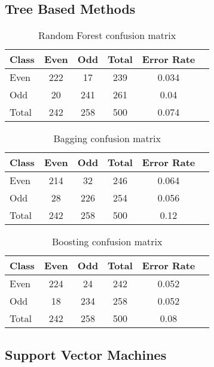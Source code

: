 \documentclass[a4paper,10pt]{article}
\begin{document}
\subsection{Tree Based Methods}
\begin{figure}[H]
  \hfill
  \hfill
\end{figure}

\begin{table}[h]
\centering
\begin{tabular}{l*{4}{c}r}
  Class & Even & Odd & Total & Error Rate\\
  \hline
  Even & 222 & 17 & 239 & 0.034 \\
  Odd & 20 & 241 & 261 & 0.04\\
  Total & 242 & 258 & 500 & 0.074\\
\end{tabular}
\caption{Random Forest confusion matrix}
\label{table:rf_conf}
\end{table}

\begin{table}[h]
\centering
\begin{tabular}{l*{4}{c}r}
  Class              & Even & Odd & Total & Error Rate\\
  \hline
  Even & 214 & 32 & 246 & 0.064 \\
  Odd & 28 & 226 & 254 & 0.056\\
  Total & 242 & 258 & 500 & 0.12\\
\end{tabular}
\caption{Bagging confusion matrix}
\label{table:bag_conf}
\end{table}

\begin{table}[h]
\centering
\begin{tabular}{l*{4}{c}r}
  Class              & Even & Odd & Total & Error Rate\\
  \hline
  Even & 224 & 24 & 242 & 0.052 \\
  Odd & 18 & 234 & 258 & 0.052\\
  Total & 242 & 258 & 500 & 0.08\\
\end{tabular}
\caption{Boosting confusion matrix}
\label{table:boost_conf}
\end{table}

\subsection{Support Vector Machines}
\begin{figure}[H]
  \hfill
   \\
  \hfill
\end{figure}
\end{document}
